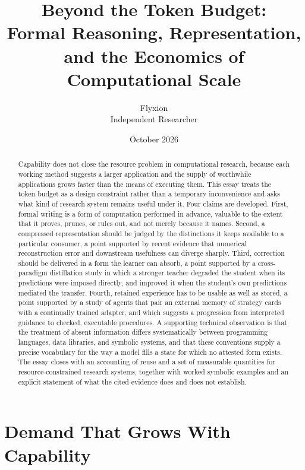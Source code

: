 \documentclass[11pt]{article}
\title{Beyond the Token Budget:\\[0.3em]
\large Formal Reasoning, Representation, and the Economics of Computational Scale}
\author{Flyxion\\ \small Independent Researcher}
\date{October 2026}
\theoremstyle{remark}
\begin{document}
\maketitle

\begin{abstract}
\noindent
Capability does not close the resource problem in computational research, because each working method suggests a larger application and the supply of worthwhile applications grows faster than the means of executing them. This essay treats the token budget as a design constraint rather than a temporary inconvenience and asks what kind of research system remains useful under it. Four claims are developed. First, formal writing is a form of computation performed in advance, valuable to the extent that it proves, prunes, or rules out, and not merely because it names. Second, a compressed representation should be judged by the distinctions it keeps available to a particular consumer, a point supported by recent evidence that numerical reconstruction error and downstream usefulness can diverge sharply. Third, correction should be delivered in a form the learner can absorb, a point supported by a cross-paradigm distillation study in which a stronger teacher degraded the student when its predictions were imposed directly, and improved it when the student's own predictions mediated the transfer. Fourth, retained experience has to be usable as well as stored, a point supported by a study of agents that pair an external memory of strategy cards with a continually trained adapter, and which suggests a progression from interpreted guidance to checked, executable procedures. A supporting technical observation is that the treatment of absent information differs systematically between programming languages, data libraries, and symbolic systems, and that these conventions supply a precise vocabulary for the way a model fills a state for which no attested form exists. The essay closes with an accounting of reuse and a set of measurable quantities for resource-constrained research systems, together with worked symbolic examples and an explicit statement of what the cited evidence does and does not establish.
\end{abstract}

\section{Demand That Grows With Capability}
\end{document}
